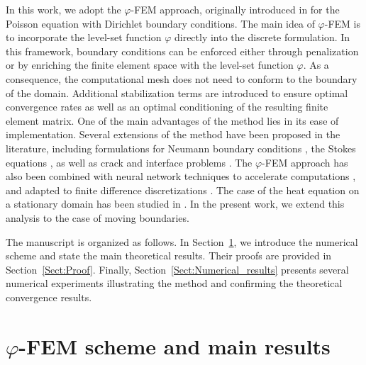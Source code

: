 \documentclass[11pt,a4paper]{article}
\theoremstyle{plain}
\theoremstyle{definition}
\theoremstyle{remark}
\numberwithin{equation}{section}
\begin{document}
In this work, we adopt the $\varphi$-FEM approach, originally introduced in \cite{duprez2020phi} for the Poisson equation with Dirichlet boundary conditions. The main idea of $\varphi$-FEM is to incorporate the level-set function $\varphi$ directly into the discrete formulation. In this framework, boundary conditions can be enforced either through penalization or by enriching the finite element space with the level-set function $\varphi$. As a consequence, the computational mesh does not need to conform to the boundary of the domain.
Additional stabilization terms are introduced to ensure optimal convergence rates as well as an optimal conditioning of the resulting finite element matrix. One of the main advantages of the method lies in its ease of implementation.
Several extensions of the method have been proposed in the literature, including formulations for Neumann boundary conditions \cite{neumann}, the Stokes equations \cite{duprez2023phi}, as well as crack and interface problems \cite{chapitre}. The $\varphi$-FEM approach has also been combined with neural network techniques to accelerate computations \cite{phiFEMFNO}, and adapted to finite difference discretizations \cite{phiFD}. The case of the heat equation on a stationary domain has been studied in \cite{heat}. In the present work, we extend this analysis to the case of moving boundaries.

The manuscript is organized as follows. In Section~\ref{Sect:Scheme_and_main_results}, we introduce the numerical scheme and state the main theoretical results. Their proofs are provided in Section~\ref{Sect:Proof}. Finally, Section~\ref{Sect:Numerical_results} presents several numerical experiments illustrating the method and confirming the theoretical convergence results.

\section{\texorpdfstring{{$\varphi$}}{phi}-FEM scheme and main results}\label{Sect:Scheme_and_main_results}
\end{document}
